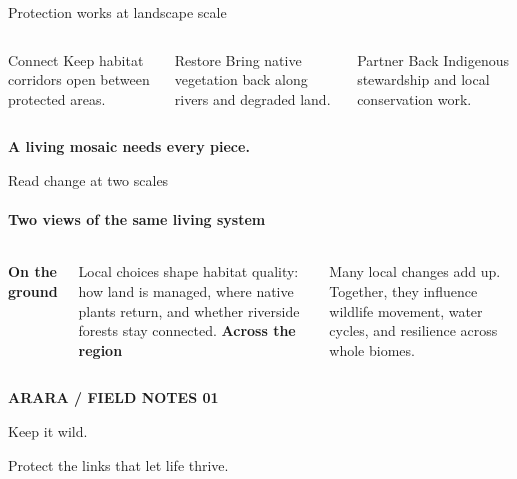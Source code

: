 \documentclass[10pt,aspectratio=169]{beamer}
\begin{document}
\begin{frame}{Protection works at landscape scale}
  \begin{columns}[T,onlytextwidth]
    \begin{block}{Connect}
      Keep habitat corridors open between protected areas.
    \end{block}
    \begin{exampleblock}{Restore}
      Bring native vegetation back along rivers and degraded land.
    \end{exampleblock}
    \begin{alertblock}{Partner}
      Back Indigenous stewardship and local conservation work.
    \end{alertblock}
  \end{columns}
  \vfill
  \begin{center}\Large\bfseries A living mosaic needs every piece.
  \end{center}
\end{frame}

\begin{frame}{Read change at two scales}
  \framesubtitle{Two views of the same living system}
  \begin{columns}[T,onlytextwidth]
    \textbf{On the ground}\par
    \vspace{0.25cm}
    Local choices shape habitat quality: how land is managed, where native
    plants return, and whether riverside forests stay connected.
    \textbf{Across the region}\par
    \vspace{0.25cm}
    Many local changes add up. Together, they influence wildlife movement,
    water cycles, and resilience across whole biomes.
  \end{columns}
\end{frame}

\begin{frame}[plain]
  \vspace{1.3cm}
  {\color{araraGold}\small\bfseries ARARA  /  FIELD NOTES 01}\par
  \vspace{0.6cm}
  {\color{araraPaper}Keep it wild.}\par
  \vspace{0.4cm}
  {\large\color{araraPaper!75}Protect the links that let life thrive.}\par
\end{frame}
\end{document}
